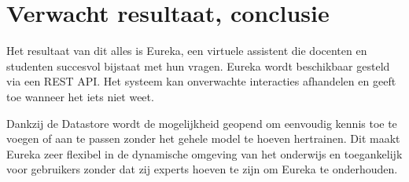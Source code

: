 \section{Verwacht resultaat, conclusie}%
\label{sec:verwachte_resultaten}

Het resultaat van dit alles is Eureka, een virtuele assistent die docenten en studenten succesvol bijstaat met hun vragen. Eureka wordt beschikbaar gesteld via een REST API. Het systeem kan onverwachte interacties afhandelen en geeft toe wanneer het iets niet weet.

Dankzij de Datastore wordt de mogelijkheid geopend om eenvoudig kennis toe te voegen of aan te passen zonder het gehele model te hoeven hertrainen. Dit maakt Eureka zeer flexibel in de dynamische omgeving van het onderwijs en toegankelijk voor gebruikers zonder dat zij experts hoeven te zijn om Eureka te onderhouden.